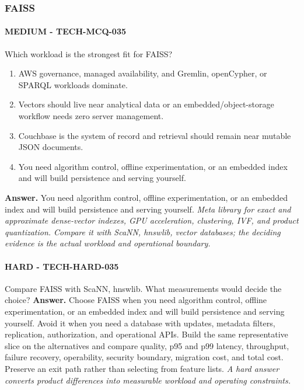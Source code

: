 \subsubsection*{FAISS}
\paragraph{MEDIUM - TECH-MCQ-035} Which workload is the strongest fit for FAISS?
\begin{enumerate}[label=\Alph*.]
\item AWS governance, managed availability, and Gremlin, openCypher, or SPARQL workloads dominate.
\item Vectors should live near analytical data or an embedded/object-storage workflow needs zero server management.
\item Couchbase is the system of record and retrieval should remain near mutable JSON documents.
\item You need algorithm control, offline experimentation, or an embedded index and will build persistence and serving yourself.
\end{enumerate}
\textbf{Answer.} You need algorithm control, offline experimentation, or an embedded index and will build persistence and serving yourself.
\textit{Meta library for exact and approximate dense-vector indexes, GPU acceleration, clustering, IVF, and product quantization. Compare it with ScaNN, hnswlib, vector databases; the deciding evidence is the actual workload and operational boundary.}
\paragraph{HARD - TECH-HARD-035} Compare FAISS with ScaNN, hnswlib. What measurements would decide the choice?
\textbf{Answer.} Choose FAISS when you need algorithm control, offline experimentation, or an embedded index and will build persistence and serving yourself. Avoid it when you need a database with updates, metadata filters, replication, authorization, and operational APIs. Build the same representative slice on the alternatives and compare quality, p95 and p99 latency, throughput, failure recovery, operability, security boundary, migration cost, and total cost. Preserve an exit path rather than selecting from feature lists.
\textit{A hard answer converts product differences into measurable workload and operating constraints.}
